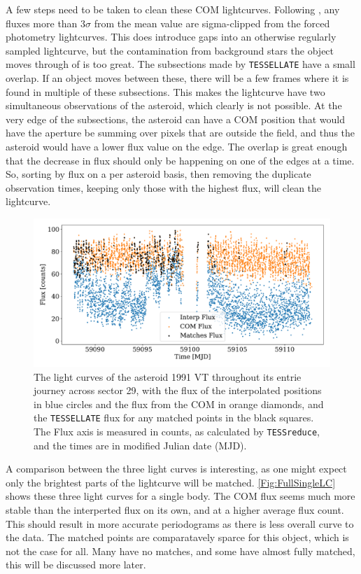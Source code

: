 \documentclass{UCreport}
\begin{document}
A few steps need to be taken to clean these COM lightcurves. 
Following \citet{McNeill2023}, any fluxes more than $3\sigma$ from the mean value are sigma-clipped from the forced photometry lightcurves.
This does introduce gaps into an otherwise regularly sampled lightcurve, but the contamination from background stars the object moves through of is too great.
The subsections made by \texttt{TESSELLATE} have a small overlap. 
If an object moves between these, there will be a few frames where it is found in multiple of these subsections.
This makes the lightcurve have two simultaneous observations of the asteroid, which clearly is not possible.
At the very edge of the subsections, the asteroid can have a COM position that would have the aperture be summing over pixels that are outside the field, and thus the asteroid would have a lower flux value on the edge.
The overlap is great enough that the decrease in flux should only be happening on one of the edges at a time.
So, sorting by flux on a per asteroid basis, then removing the duplicate observation times, keeping only those with the highest flux, will clean the lightcurve. 


\begin{figure}
  \centering
  \includegraphics[width =\textwidth]{../OzData/SingleBodyLC1991 VT.pdf}
  \caption[Light curves Example]{The light curves of the asteroid 1991 VT throughout its entrie journey across sector 29, with the flux of the interpolated positions in blue circles and the flux from the COM in orange diamonds, and the \texttt{TESSELLATE} flux for any matched points in the black squares.
    The Flux axis is measured in counts, as calculated by \texttt{TESSreduce}, and the times are in modified Julian date (MJD).}
  \label{Fig:FullSingleLC}
\end{figure}
A comparison between the three light curves is interesting, as one might expect only the brightest parts of the lightcurve will be matched.
\autoref{Fig:FullSingleLC} shows these three light curves for a single body.
The COM flux seems much more stable than the interperted flux on its own, and at a higher average flux count.
This should result in more accurate periodograms as there is less overall curve to the data.
The matched points are comparatavely sparce for this object, which is not the case for all.
Many have no matches, and some have almost fully matched, this will be discussed more later.
\end{document}
